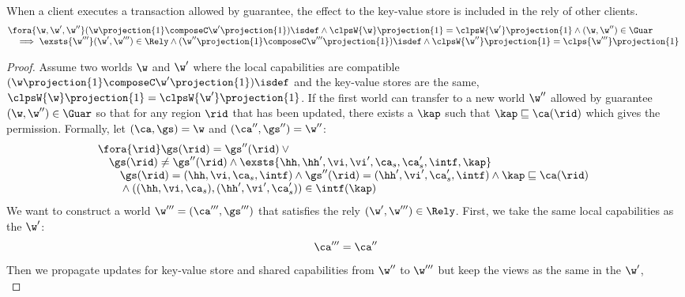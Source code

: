 \begin{lemma}
When a client executes a transaction allowed by guarantee, the effect to the key-value store is included in the rely of other clients.
\label{lem:locality-update}
\[
\begin{array}{@{}l}
    \fora{\w, \w', \w''} (\w\projection{1} \composeC \w'\projection{1})\isdef \land \clpsW{\w}\projection{1} = \clpsW{\w'}\projection{1} \land (\w, \w'') \in \Guar  \\
    \quad \implies \exsts{\w'''} (\w', \w''') \in \Rely \land (\w''\projection{1} \composeC \w'''\projection{1})\isdef \land \clpsW{\w''}\projection{1} = \clps{\w'''}\projection{1}
\end{array} 
\]
\end{lemma}
\begin{proof}
Assume two worlds \( \w \) and \( \w' \) where the local capabilities are compatible \((\w\projection{1} \composeC \w'\projection{1})\isdef\) and the key-value stores are the same, \ie \( \clpsW{\w}\projection{1} = \clpsW{\w'}\projection{1} \).
If the first world can transfer to a new world \( \w'' \) allowed by guarantee \( (\w, \w'' ) \in \Guar \) so that for any region \( \rid \) that has been updated, there exists a \( \kap \) such that \( \kap \sqsubseteq \ca(\rid) \) which gives the permission.
Formally, let \( (\ca, \gs) = \w \) and \( (\ca'', \gs'') = \w'' \):
\[
\begin{array}{@{}l}
    \fora{\rid} 
    \gs(\rid) = \gs''(\rid) \lor {} \\
    \quad \gs(\rid) \neq \gs''(\rid) 
    \land \exsts{\hh, \hh', \vi, \vi', \ca_s, \ca_{s}', \intf, \kap} \\
    \qquad \gs(\rid) = (\hh, \vi, \ca_{s}, \intf) 
    \land \gs''(\rid) = (\hh', \vi', \ca_{s}', \intf)
    \land \kap \sqsubseteq \ca(\rid) \\
    \qquad {} \land ((\hh, \vi, \ca_{s}), (\hh', \vi', \ca_{s}')) \in \intf(\kap)
\end{array} 
\]
We want to construct a world \( \w''' = (\ca''', \gs''') \) that satisfies the rely \( (\w', \w''') \in \Rely \).
First, we take the same local capabilities as the \( \w' \):
\begin{equation}
\label{equ:construct-local-ca}
    \ca''' = \ca''
\end{equation}
Then we propagate updates for key-value store and shared capabilities from \( \w'' \) to \( \w''' \) but keep the views as the same in the \( \w' \),
\begin{equation}

\end{equation}
\end{proof}

